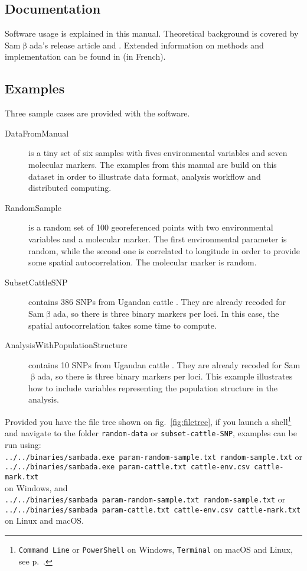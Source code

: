 \documentclass[a4paper,11pt]{article}
\newcommand{\smb}{\textsf{Sam$\upbeta$ada}}
\newcommand{\prog}[1]{\texttt{#1}}
\begin{document}
\subsection*{Documentation}
Software usage is explained in this manual.
Theoretical background is covered by \smb's release article \textcite{stucki:2016} and \textcite{joost:2007}.
Extended information on methods and implementation can be found in \textcite{stucki:2014} (in French).

\subsection*{Examples}
Three sample cases are provided with the software.
\begin{description}
\item[DataFromManual] is a tiny set of six samples with fives environmental variables and seven molecular markers.
The examples from this manual are build on this dataset in order to illustrate data format, analysis workflow and distributed computing. 
\item[RandomSample] is a random set of 100 georeferenced points with two environmental variables and a molecular marker.
The first environmental parameter is random, while the second one is correlated to longitude in order to provide some spatial autocorrelation.
The molecular marker is random.
\item[SubsetCattleSNP] contains 386 SNPs from Ugandan cattle \parencite{vajana:2018}.
They are already recoded for \smb, so there is three binary markers per loci.
In this case, the spatial autocorrelation takes some time to compute.
\item[AnalysisWithPopulationStructure] contains 10 SNPs from Ugandan cattle \parencite{vajana:2018}.
They are already recoded for \smb, so there is three binary markers per loci.
This example illustrates how to include variables representing the population structure in the analysis.
\end{description}

Provided you have the file tree shown on fig.~\ref{fig:filetree},
if you launch a shell\footnote{\prog{Command Line} or \prog{PowerShell} on Windows, \prog{Terminal} on macOS and Linux, see p.~\pageref{faq:commandline}.} and navigate to the folder \prog{random-data} or \prog{subset-cattle-SNP}, examples can be run using: \\
\verb+../../binaries/sambada.exe param-random-sample.txt random-sample.txt+ or\\
\verb+../../binaries/sambada.exe param-cattle.txt cattle-env.csv cattle-mark.txt+ \\
\label{sec:examples-launch}
on Windows, and \\
\verb+../../binaries/sambada param-random-sample.txt random-sample.txt+ or\\
\verb+../../binaries/sambada param-cattle.txt cattle-env.csv cattle-mark.txt+
on Linux and macOS.
\end{document}
